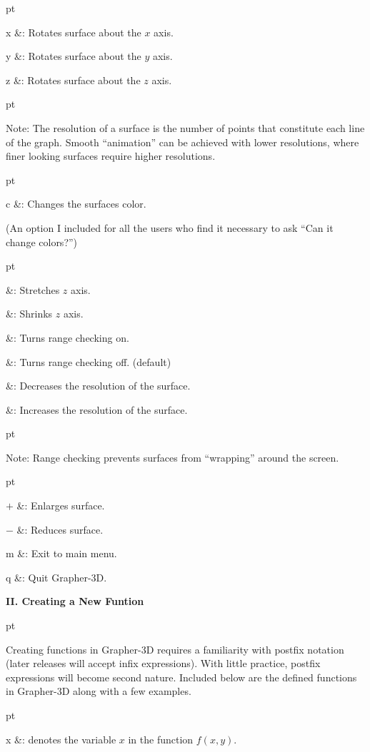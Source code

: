 pt
 \columns

\+x &: Rotates surface about the $x$ axis.\cr

\+y &: Rotates surface about the $y$ axis.\cr

\+z &: Rotates surface about the $z$ axis.\cr

 pt

\noindent
Note: The resolution of a surface is the number of points 
that constitute each line of the graph.  Smooth ``animation'' 
can be achieved with lower resolutions, where finer looking 
surfaces require higher resolutions.

 pt

\+c &: Changes the surfaces color. \cr

\noindent
(An option I included for all 
the users who find it necessary to ask ``Can it change colors?'')

 pt

 &: Stretches $z$ axis.\cr

 &: Shrinks $z$ axis.\cr

 &: Turns range checking on.\cr

 &: Turns range checking off. (default)\cr

 &: Decreases the resolution of the surface.\cr

 &: Increases the resolution of the surface.\cr

 pt

\noindent
Note: Range checking prevents surfaces from ``wrapping'' around 
the screen.

 pt

\+ $+$ &: Enlarges surface. \cr

\+ $-$ &: Reduces surface. \cr

\+ m &: Exit to main menu.\cr

\+ q &: Quit Grapher-3D. \cr

\vfill
\eject
\centerline{\bf II. Creating a New Funtion}
 pt

Creating functions in Grapher-3D requires a familiarity 
with postfix notation (later releases will accept infix 
expressions).  With little practice, postfix expressions 
will become second nature.  Included below are the defined 
functions in Grapher-3D along with a few examples.

 pt
     
\+ x   &: denotes the variable $x$ in the function $f(x,y)$.\cr
      
